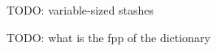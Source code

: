 \documentclass[letterpaper, 11pt]{article}
\begin{document}




TODO: variable-sized stashes

TODO: what is the fpp of the dictionary
\end{document}

